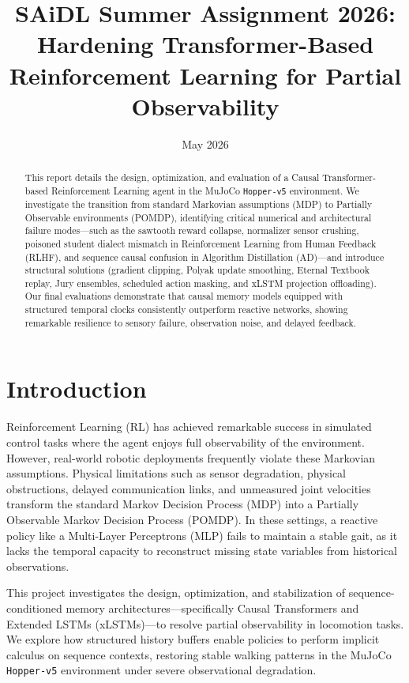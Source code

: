\documentclass[11pt,a4paper]{article}
\title{\textbf{SAiDL Summer Assignment 2026: Hardening Transformer-Based Reinforcement Learning for Partial Observability}}
\author{}
\date{May 2026}
\begin{document}
\maketitle

\begin{abstract}
This report details the design, optimization, and evaluation of a Causal Transformer-based Reinforcement Learning agent in the MuJoCo \texttt{Hopper-v5} environment. We investigate the transition from standard Markovian assumptions (MDP) to Partially Observable environments (POMDP), identifying critical numerical and architectural failure modes---such as the sawtooth reward collapse, normalizer sensor crushing, poisoned student dialect mismatch in Reinforcement Learning from Human Feedback (RLHF), and sequence causal confusion in Algorithm Distillation (AD)---and introduce structural solutions (gradient clipping, Polyak update smoothing, Eternal Textbook replay, Jury ensembles, scheduled action masking, and xLSTM projection offloading). Our final evaluations demonstrate that causal memory models equipped with structured temporal clocks consistently outperform reactive networks, showing remarkable resilience to sensory failure, observation noise, and delayed feedback.
\end{abstract}

\newpage
\tableofcontents
\newpage

\section{Introduction}
Reinforcement Learning (RL) has achieved remarkable success in simulated control tasks where the agent enjoys full observability of the environment. However, real-world robotic deployments frequently violate these Markovian assumptions. Physical limitations such as sensor degradation, physical obstructions, delayed communication links, and unmeasured joint velocities transform the standard Markov Decision Process (MDP) into a Partially Observable Markov Decision Process (POMDP). In these settings, a reactive policy like a Multi-Layer Perceptrons (MLP) fails to maintain a stable gait, as it lacks the temporal capacity to reconstruct missing state variables from historical observations.

This project investigates the design, optimization, and stabilization of sequence-conditioned memory architectures—specifically Causal Transformers and Extended LSTMs (xLSTMs)—to resolve partial observability in locomotion tasks. We explore how structured history buffers enable policies to perform implicit calculus on sequence contexts, restoring stable walking patterns in the MuJoCo \texttt{Hopper-v5} environment under severe observational degradation.
\end{document}
